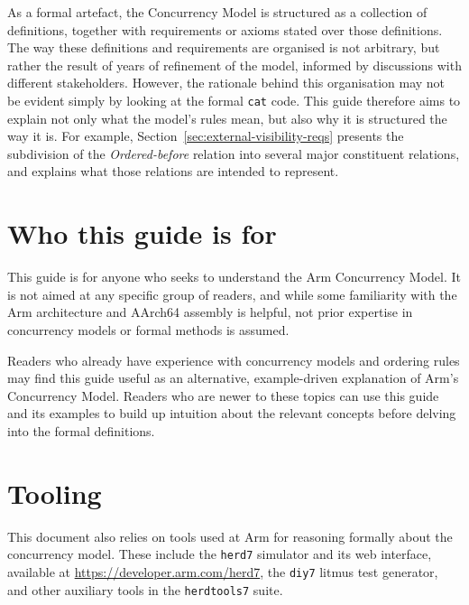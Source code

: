 \documentclass{book}
\begin{document}
As a formal artefact, the Concurrency Model is structured as a collection of
definitions, together with requirements or axioms stated over those
definitions. The way these definitions and requirements are organised is not
arbitrary, but rather the result of years of refinement of the model, informed
by discussions with different stakeholders. However, the rationale behind this
organisation may not be evident simply by looking at the formal \texttt{cat}
code. This guide therefore aims to explain not only what the model's rules
mean, but also why it is structured the way it is. For example,
Section~\ref{sec:external-visibility-reqs} presents the subdivision of the
\textit{Ordered-before} relation into several major constituent relations, and
explains what those relations are intended to represent.

%

\section{Who this guide is for}

This guide is for anyone who seeks to understand the Arm Concurrency Model. It
is not aimed at any specific group of readers, and while some familiarity with
the Arm architecture and AArch64 assembly is helpful, not prior expertise in
concurrency models or formal methods is assumed.

Readers who already have experience with concurrency models and ordering rules may
find this guide useful as an alternative, example-driven explanation of Arm's
Concurrency Model. Readers who are newer to these topics can use this guide and
its examples to build up intuition about the relevant concepts before delving
into the formal definitions.

\section{Tooling}

This document also relies on tools used at Arm for reasoning formally about the
concurrency model. These include the \texttt{herd7} simulator and its web
interface, available at \url{https://developer.arm.com/herd7}, the
\texttt{diy7} litmus test generator, and other auxiliary tools in the
\texttt{herdtools7} suite.
\end{document}
